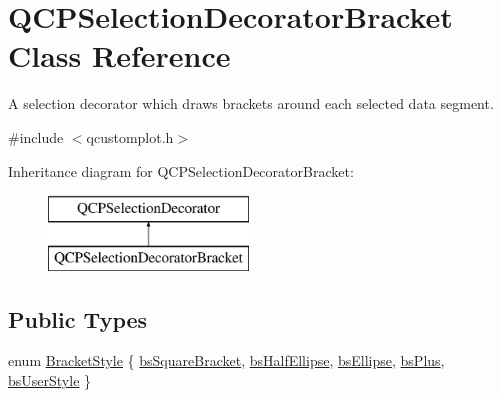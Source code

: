 \hypertarget{class_q_c_p_selection_decorator_bracket}{}\section{Q\+C\+P\+Selection\+Decorator\+Bracket Class Reference}
\label{class_q_c_p_selection_decorator_bracket}


A selection decorator which draws brackets around each selected data segment.  




{\ttfamily \#include $<$qcustomplot.\+h$>$}

Inheritance diagram for Q\+C\+P\+Selection\+Decorator\+Bracket\+:\begin{figure}[H]
\begin{center}
\leavevmode
\includegraphics[height=2.000000cm]{d1/d33/class_q_c_p_selection_decorator_bracket}
\end{center}
\end{figure}
\subsection*{Public Types}
\begin{DoxyCompactItemize}
\item 
enum \mbox{\hyperlink{class_q_c_p_selection_decorator_bracket_aa6d18517ec0553575bbef0de4252336e}{Bracket\+Style}} \{ \newline
\mbox{\hyperlink{class_q_c_p_selection_decorator_bracket_aa6d18517ec0553575bbef0de4252336eaa10a8d25d409b09256a13220a4d74f81}{bs\+Square\+Bracket}}, 
\mbox{\hyperlink{class_q_c_p_selection_decorator_bracket_aa6d18517ec0553575bbef0de4252336eafa8ad19b1822c9c03fbe5e9ff8eeeea2}{bs\+Half\+Ellipse}}, 
\mbox{\hyperlink{class_q_c_p_selection_decorator_bracket_aa6d18517ec0553575bbef0de4252336ea7cab0f2f406e293094a7a1e4903f6e8c}{bs\+Ellipse}}, 
\mbox{\hyperlink{class_q_c_p_selection_decorator_bracket_aa6d18517ec0553575bbef0de4252336ea86eb6ae27e6296576fdc46d13c840530}{bs\+Plus}}, 
\newline
\mbox{\hyperlink{class_q_c_p_selection_decorator_bracket_aa6d18517ec0553575bbef0de4252336ea5a627cacdaa30ce434371d6a034b991d}{bs\+User\+Style}}
 \}
\end{DoxyCompactItemize}

